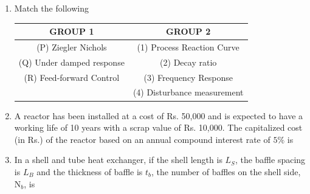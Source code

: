 \documentclass[journal,12pt,onecolumn]{IEEEtran}
\theoremstyle{remark}
\begin{document}
\begin{enumerate}
\item  Match the following
\begin{center}
\begin{tabular}{c|c}
GROUP 1 & GROUP 2 \\
\hline
(P) Ziegler Nichols & (1) Process Reaction Curve \\
(Q) Under damped response & (2) Decay ratio \\
(R) Feed-forward Control & (3) Frequency Response \\
& (4) Disturbance measurement \\
\end{tabular}
\end{center}
\hfill{}
\begin{enumerate}
\end{enumerate}

\item A reactor has been installed at a cost of Rs. 50,000 and is expected to have a working life of 10 years with a scrap value of Rs. 10,000. The capitalized cost (in Rs.) of the reactor based on an annual compound interest rate of $5\%$ is
\hfill{}
\begin{enumerate}
\end{enumerate}

\item  In a shell and tube heat exchanger, if the shell length is $L_S$, the baffle spacing is $L_B$ and the thickness of baffle is $t_b$, the number of baffles on the shell side, $\mathrm{N}_b$, is
\hfill{}
\begin{enumerate}
\end{enumerate}


\end{enumerate}
\end{document}
